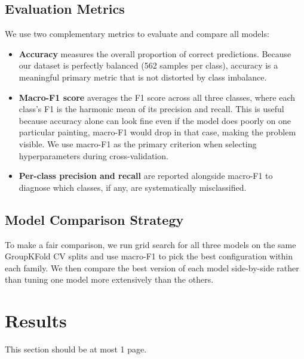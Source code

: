 \documentclass[12pt]{article}
\begin{document}
\subsection{Evaluation Metrics}
We use two complementary metrics to evaluate and compare all models:
\begin{itemize}
    \item \textbf{Accuracy} measures the overall proportion of correct predictions. Because our dataset is perfectly balanced (562 samples per class), accuracy is a meaningful primary metric that is not distorted by class imbalance.
    \item \textbf{Macro-F1 score} averages the F1 score across all three classes, where each class's F1 is the harmonic mean of its precision and recall. This is useful because accuracy alone can look fine even if the model does poorly on one particular painting, macro-F1 would drop in that case, making the problem visible. We use macro-F1 as the primary criterion when selecting hyperparameters during cross-validation.
    \item \textbf{Per-class precision and recall} are reported alongside macro-F1 to diagnose which classes, if any, are systematically misclassified.
\end{itemize}

\subsection{Model Comparison Strategy}
To make a fair comparison, we run grid search for all three models on the same GroupKFold CV splits and use macro-F1 to pick the best configuration within each family. We then compare the best version of each model side-by-side rather than tuning one model more extensively than the others. 

\newpage
        
\section{Results}\label{sec:results}

This section should be at most 1 page.
\end{document}
